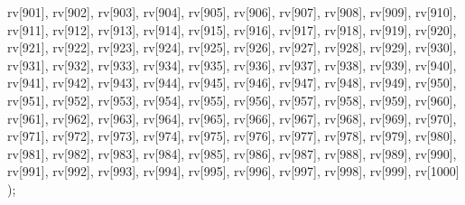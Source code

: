 \begin{DoxyCode}
{  rv[901],
  rv[902],
  rv[903],
  rv[904],
  rv[905],
  rv[906],
  rv[907],
  rv[908],
  rv[909],
  rv[910],
  rv[911],
  rv[912],
  rv[913],
  rv[914],
  rv[915],
  rv[916],
  rv[917],
  rv[918],
  rv[919],
  rv[920],
  rv[921],
  rv[922],
  rv[923],
  rv[924],
  rv[925],
  rv[926],
  rv[927],
  rv[928],
  rv[929],
  rv[930],
  rv[931],
  rv[932],
  rv[933],
  rv[934],
  rv[935],
  rv[936],
  rv[937],
  rv[938],
  rv[939],
  rv[940],
  rv[941],
  rv[942],
  rv[943],
  rv[944],
  rv[945],
  rv[946],
  rv[947],
  rv[948],
  rv[949],
  rv[950],
  rv[951],
  rv[952],
  rv[953],
  rv[954],
  rv[955],
  rv[956],
  rv[957],
  rv[958],
  rv[959],
  rv[960],
  rv[961],
  rv[962],
  rv[963],
  rv[964],
  rv[965],
  rv[966],
  rv[967],
  rv[968],
  rv[969],
  rv[970],
  rv[971],
  rv[972],
  rv[973],
  rv[974],
  rv[975],
  rv[976],
  rv[977],
  rv[978],
  rv[979],
  rv[980],
  rv[981],
  rv[982],
  rv[983],
  rv[984],
  rv[985],
  rv[986],
  rv[987],
  rv[988],
  rv[989],
  rv[990],
  rv[991],
  rv[992],
  rv[993],
  rv[994],
  rv[995],
  rv[996],
  rv[997],
  rv[998],
  rv[999],
  rv[1000]
  );
}
\end{DoxyCode}
